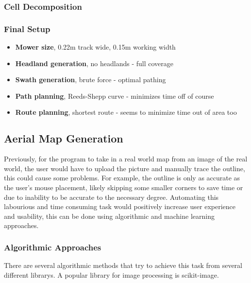 \documentclass[final]{cmpreport_02}
\begin{document}
\subsubsection{Cell Decomposition}


\subsubsection{Final Setup}

\begin{itemize}
	\item{\textbf{Mower size}, 0.22m track wide, 0.15m working width}
	\item{\textbf{Headland generation}, no headlands - full coverage}
	\item{\textbf{Swath generation}, brute force - optimal pathing}
	\item{\textbf{Path planning}, Reeds-Shepp curve - minimizes time off of course}
	\item{\textbf{Route planning}, shortest route - seems to minimize time out of area too}
\end{itemize}



\subsection{Aerial Map Generation}
Previously, for the program to take in a real world map from an image of the real world, the user would have to upload the picture and manually trace the outline, this could cause some problems.
For example, the outline is only as accurate as the user's mouse placement, likely skipping some smaller corners to save time or due to inability to be accurate to the necessary degree.
Automating this labourious and time consuming task would positively increase user experience and usability, this can be done using algorithmic and machine learning approaches.

\subsubsection{Algorithmic Approaches}
There are several algorithmic methods that try to achieve this task from several different librarys. A popular library for image processing is scikit-image.
\end{document}
